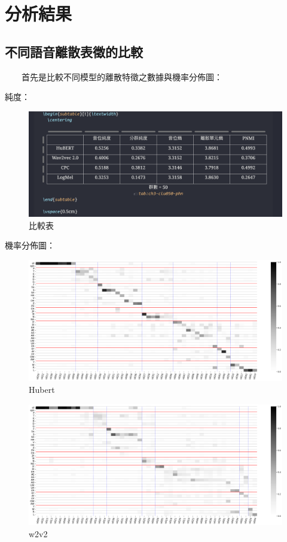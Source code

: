 \section{分析結果}

\subsection{不同語音離散表徵的比較}

　　首先是比較不同模型的離散特徵之數據與機率分佈圖：

純度：

\begin{figure}
    \centering
    \includegraphics[width=1\linewidth]{figures/000.png}
    \caption{比較表}
    \label{fig:enter-label}
\end{figure}

機率分佈圖：

\begin{figure}
    \centering
    \includegraphics[width=1\linewidth]{figures/hubert50.png}
    \caption{Hubert}
    \label{fig:enter-label}
\end{figure}
\begin{figure}
    \centering
    \includegraphics[width=1\linewidth]{figures/w2v250.png}
    \caption{w2v2}
    \label{fig:enter-label}
\end{figure}

